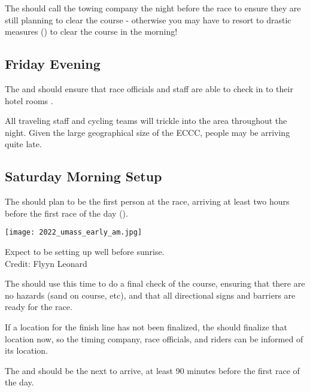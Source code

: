The  should call the towing company the night before the race to ensure they are still planning to clear the course -
otherwise you may have to resort to drastic measures () to clear the course in the morning!

\subsection{Friday Evening}

The  and  should ensure that race officials and staff are able to check in to their hotel rooms%
%
.

All traveling staff and cycling teams will trickle into the area throughout the night.
Given the large geographical size of the ECCC, people may be arriving quite late.

\subsection{Saturday Morning Setup}

The  should plan to be the first person at the race, arriving at least two hours before the first race of the day
().

\begin{marginfigure}
  \texttt{[image: 2022\_umass\_early\_am.jpg]}
  \caption[Early morning race setup]{Expect to be setting up well before sunrise.\\
            Credit: Flyyn Leonard}
\end{marginfigure}

The  should use this time to do a final check of the course,
ensuring that there are no hazards (sand on course, etc),
and that all directional signs and barriers are ready for the race.

If a location for the finish line has not been finalized, the  should finalize that location now,
so the timing company, race officials, and riders can be informed of its location.

The  and  should be the next to arrive, at least 90 minutes before the first race of the day.

